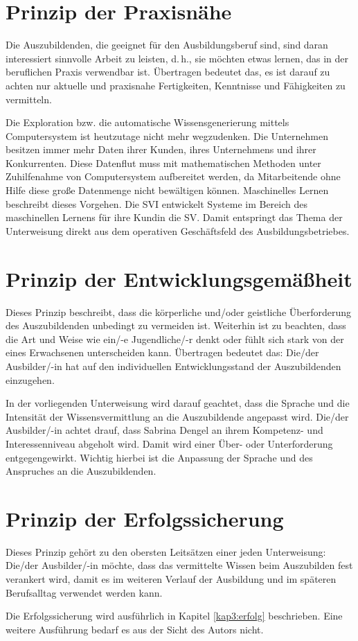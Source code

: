 \section{Prinzip der Praxisnähe}
Die Auszubildenden, die geeignet für den Ausbildungsberuf sind, sind daran interessiert sinnvolle Arbeit zu leisten, d.\,h., sie möchten etwas lernen, das in der beruflichen Praxis verwendbar ist. Übertragen bedeutet das, es ist darauf zu achten nur aktuelle und praxisnahe Fertigkeiten, Kenntnisse und Fähigkeiten zu vermitteln. 
\par
Die Exploration bzw. die automatische Wissensgenerierung mittels Computersystem ist heutzutage nicht mehr wegzudenken. Die Unternehmen besitzen immer mehr Daten ihrer Kunden, ihres Unternehmens und ihrer Konkurrenten.\autocite[vgl.][]{noauthor_hochschule_nodate}\autocite[vgl.][]{noauthor_volkswagen_nodate} Diese Datenflut muss mit mathematischen Methoden unter Zuhilfenahme von Computersystem aufbereitet werden, da Mitarbeitende ohne Hilfe diese große Datenmenge nicht bewältigen können. Maschinelles Lernen beschreibt dieses Vorgehen. Die \ac{SVI} entwickelt Systeme im Bereich des maschinellen Lernens für ihre Kundin die \ac{SV}. Damit entspringt das Thema der Unterweisung direkt aus dem operativen Geschäftsfeld des Ausbildungsbetriebes. 

\section{Prinzip der Entwicklungsgemäßheit}
Dieses Prinzip beschreibt, dass die körperliche und/oder geistliche Überforderung des Auszubildenden unbedingt zu vermeiden ist. Weiterhin ist zu beachten, dass die Art und Weise wie ein/-e Jugendliche/-r denkt oder fühlt sich stark von der eines Erwachsenen unterscheiden kann. Übertragen bedeutet das: Die/der Ausbilder/-in hat auf den individuellen Entwicklungsstand der Auszubildenden einzugehen. 
\par
In der vorliegenden Unterweisung wird darauf geachtet, dass die Sprache und die Intensität der Wissensvermittlung an die Auszubildende angepasst wird. Die/der Ausbilder/-in achtet drauf, dass Sabrina Dengel an ihrem Kompetenz- und Interessenniveau abgeholt wird. Damit wird einer Über- oder Unterforderung entgegengewirkt. Wichtig hierbei ist die Anpassung der Sprache und des Anspruches an die Auszubildenden.

\section{Prinzip der Erfolgssicherung}
Dieses Prinzip gehört zu den obersten Leitsätzen einer jeden Unterweisung: Die/der Ausbilder/-in möchte, dass das vermittelte Wissen beim Auszubilden fest verankert wird, damit es im weiteren Verlauf der Ausbildung und im späteren Berufsalltag verwendet werden kann. 
\par
Die Erfolgssicherung wird ausführlich in Kapitel \vref{kap3:erfolg} beschrieben. Eine weitere Ausführung bedarf es aus der Sicht des Autors nicht.

